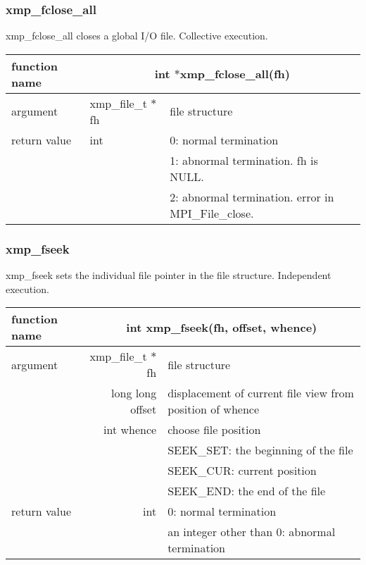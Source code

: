    \subsubsection{xmp\_fclose\_all}
   xmp\_fclose\_all closes a global I/O file. Collective execution.

   \begin{table}[h]
    \begin{center}
     \begin{tabular}{|l|l|p{80mm}|}
      \hline
      {\bf function name}  & \multicolumn{2}{c|}{\bf int
      $*$xmp\_fclose\_all(fh)} \\ \hline \hline
      argument & xmp\_file\_t $*$fh & file structure \\ \hline
      return value & int & 0: normal termination \\
      &  & 1: abnormal termination. fh is NULL. \\
      &  & 2: abnormal termination. error in MPI\_File\_close. \\ \hline
      \end{tabular}
     \end{center}
    \label{tb:close}
   \end{table}

   \subsubsection{xmp\_fseek}
   xmp\_fseek sets the individual file pointer in the file structure. Independent execution.

   \begin{table}[h]
    \begin{center}
     \begin{tabular}{|l|r|p{70mm}|}
      \hline
      {\bf function name}  & \multicolumn{2}{c|}{\bf int xmp\_fseek(fh,
      offset, whence)}  \\ \hline \hline
      argument & xmp\_file\_t $*$fh & file structure \\ \cline{2-3}
      & long long offset & displacement of current file view from
	      position of whence \\ \cline{2-3}
      & int whence & choose file position \\
      &  & SEEK\_SET: the beginning of the file \\ 
      &  & SEEK\_CUR: current position \\ 
      &  & SEEK\_END: the end of the file \\ \hline
      return value & int & 0: normal termination \\
      &  & an integer other than 0: abnormal termination \\ \hline
      \end{tabular}
     \end{center}
   \end{table}

